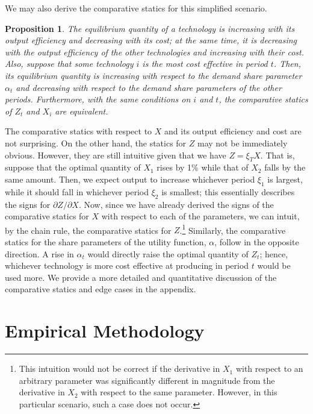 \documentclass[11pt,a4paper]{extarticle}
\newtheorem{proposition}{Proposition}
\begin{document}
We may also derive the comparative statics for this simplified scenario.  
\begin{proposition}
	The equilibrium quantity of a technology is increasing with its output efficiency and decreasing with its cost; at the same time, it is decreasing with the output efficiency of the other technologies and increasing with their cost. Also, suppose that some technology $i$ is the most cost effective in period $t$. Then, its equilibrium quantity is increasing with respect to the demand share parameter $\alpha_t$ and decreasing with respect to the demand share parameters of the other periods. Furthermore, with the same conditions on $i$ and $t$, the comparative statics of $Z_t$ and $X_i$ are equivalent. 
\end{proposition}	
The comparative statics with respect to $X$ and its output efficiency and cost are not surprising. On the other hand, the statics for $Z$ may not be immediately obvious. However, they are still intuitive given that we have $Z = \xi_T X$. That is, suppose that the optimal quantity of $X_1$ rises by 1\% while that of $X_2$ falls by the same amount. Then, we expect output to increase whichever period $\xi_1$ is largest, while it should fall in whichever period $\xi_2$ is smallest; this essentially describes the signs for $\partial Z / \partial X$. Now, since we have already derived the signs of the comparative statics for $X$ with respect to each of the parameters, we can intuit, by the chain rule, the comparative statics for $Z$.\footnote{This intuition would not be correct if the derivative in $X_1$ with respect to an arbitrary parameter was significantly different in magnitude from the derivative in $X_2$ with respect to the same parameter. However, in this particular scenario, such a case does not occur.} Similarly, the comparative statics for the share parameters of the utility function, $\alpha$, follow in the opposite direction. A rise in $\alpha_t$ would directly raise the optimal quantity of $Z_t$; hence, whichever technology is more cost effective at producing in period $t$ would be used more. We provide a more detailed and quantitative discussion of the comparative statics and edge cases in the appendix. 





\section{Empirical Methodology}
\end{document}
